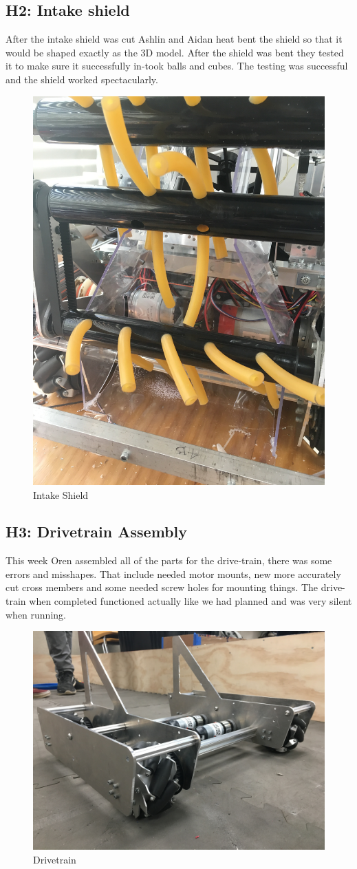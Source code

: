 \documentclass{article}
\begin{document}
\subsection{H2: Intake shield}

After the intake shield was cut Ashlin and Aidan heat bent the shield so that it would be shaped exactly as the 3D model. After the shield was bent they tested it to make sure it successfully in-took balls and cubes. The testing was successful and the shield worked  spectacularly.

\begin{figure}
    \centering
    \includegraphics[width=.6\textwidth, angle=270]{10_11-05/images/intake_shield.JPG}
    \caption{Intake Shield}
    \label{fig:Intake Shield}
\end{figure}

\subsection{H3: Drivetrain Assembly}

This week Oren assembled all of the parts for the drive-train, there was some errors and misshapes. That include needed motor mounts, new more accurately cut cross members and some needed   screw holes for mounting things. The drive-train when completed functioned actually like we had planned and was very silent when running.    

\begin{figure}
    \centering
    \includegraphics[width=.6 \textwidth]{10_11-05/images/drivetrain.JPG}
    \caption{Drivetrain}
    \label{fig:drivetrain}
\end{figure}
\end{document}
